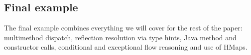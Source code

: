 \subsection{Final example}

The final example combines everything we will cover for the rest of the paper:
multimethod dispatch, reflection resolution via type hints, Java method
and constructor calls, conditional and exceptional flow reasoning
and use of HMaps.

\inputminted[firstline=6,lastline=20]{clojure}{code/demo/src/demo/eg8.clj}









